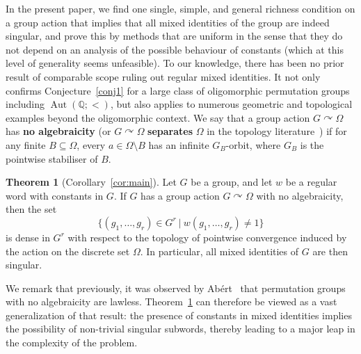 \documentclass{article}
\theoremstyle{remark}
\theoremstyle{definition}
\def\acts{\curvearrowright}
\newcommand{\remmic}[1]{\textcolor{orange}{MP: #1}}
\newcommand{\repau}[1]{\textcolor{ForestGreen}{PM: #1}}
\DeclareMathOperator{\Aut}{Aut}
\newtheorem{thmx}{Theorem}
\begin{document}
In the present paper, we find one single, simple, {and 
general} richness condition on a group action that implies that all mixed identities of the group are indeed singular, and prove this by methods that are uniform in the sense that they do not depend on an analysis of the possible behaviour of constants (which at this level of generality 
{seems unfeasible}). 
To our knowledge, there has been no prior result of comparable scope ruling {out}
regular mixed identities. %
It not only confirms Conjecture~\ref{conj1} for a large class of oligomorphic permutation groups including $\Aut(\mathbb{Q};<)$, but also applies to numerous  geometric and topological examples beyond the oligomorphic context. We say that a %
{group action} $G\acts\Omega$ has \textbf{no algebraicity} (or {$G\acts\Omega$} %
\textbf{separates}  
$\Omega$ in the topology literature~\cite{abert2005group, ivanov2025mixed})
if for any finite $B\subseteq\Omega$, every $a\in\Omega\setminus B$ has an infinite $G_B$-orbit, where $G_B$ is the pointwise  stabiliser of $B$. %

\begin{thmx}[Corollary~\ref{cor:main}]\label{mainthm:noalg} {Let $G$ be a group, and let $w$ be a regular word  with constants in $G$. If $G$ has a group action
$G\acts \Omega$  
with no algebraicity, then  the set} 
\[\{(g_1, \dots, g_r)\in G^r\ \vert \ w(g_1, \dots, g_r)\neq 1\}\]
is %
 {dense} in  $G^r$ with respect to the topology of pointwise convergence {induced by the action on the discrete set $\Omega$}. %
In particular, all mixed identities of $G$ are 
then 
singular.
\end{thmx}
We remark that previously, it was {observed by} %
Ab\'{e}rt~\cite{abert2005group} that permutation groups with no algebraicity are lawless.
Theorem~\ref{mainthm:noalg} can therefore be viewed as a vast generalization of that result:  the presence of constants in mixed identities  implies the possibility of non-trivial singular subwords, thereby leading to a major leap in the complexity of the problem. 
\end{document}

